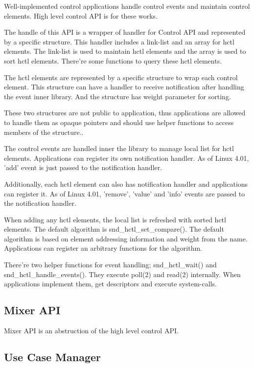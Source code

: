 \documentclass[onecolumn]{article}
\begin{document}
Well-implemented control applications handle control events and maintain control elements. High level control API is for these works.

The handle of this API is a wrapper of handler for Control API and represented by a specific structure. This handler includes a link-list and an array for hctl elements. The link-list is used to maintain hctl elements and the array is used to sort hctl elements. There're some functions to query these hctl elements.

The hctl elements are represented by a specific structure to wrap each control element. This structure can have a handler to receive notification after handling the event inner library. And the structure has weight parameter for sorting.

These two structures are not public to application, thus applications are allowed to handle them as opaque pointers and should use helper functions to access members of the structure..

The control events are handled inner the library to manage local list for hctl elements. Applications can register its own notification handler. As of Linux 4.01, 'add' event is just passed to the notification handler.

Additionally, each hctl element can also has notification handler and applications can register it. As of Linux 4.01, 'remove', 'value' and 'info' events are passed to the notification handler.

When adding any hctl elements, the local list is refreshed with sorted hctl elements. The default algorithm is snd\_hctl\_set\_compare(). The default algorithm is based on element addressing information and weight from the name. Applications can register an arbitrary functions for the algorithm.

There're two helper functions for event handling; snd\_hctl\_wait() and snd\_hctl\_handle\_events(). They execute poll(2) and read(2) internally. When applications implement them, get descriptors and execute system-calls.


\subsection{Mixer API}

Mixer API is an abstruction of the high level control API.

\subsection{Use Case Manager}
\end{document}
